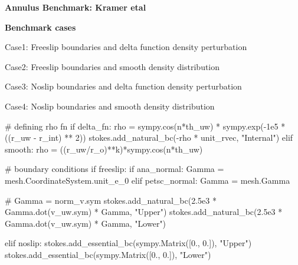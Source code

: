 \documentclass[12pt]{article}
\numberwithin{equation}{subsection}
\begin{document}
 

\cleardoublepage
{}
\recalctypearea
{}

\eject \pdfpagewidth=11.4in \pdfpageheight=10.8in 

\newpage

\vspace{1.5in} 

\textbf{Annulus Benchmark: Kramer etal}

\newpage

\textbf{Benchmark cases}
\vspace{0.2in}

\begin{adjustwidth}{1cm}{4cm}

\hspace{0.19in} Case1: Freeslip boundaries and delta function density perturbation 

Case2: Freeslip boundaries and smooth density distribution

Case3: Noslip boundaries and delta function density perturbation

Case4: Noslip boundaries and smooth density distribution 


\begin{python}
	# defining rho fn
	if delta_fn:
		rho = sympy.cos(n*th_uw) * sympy.exp(-1e5 * ((r_uw - r_int) ** 2))
		stokes.add_natural_bc(-rho * unit_rvec, "Internal")
	elif smooth:
		rho = ((r_uw/r_o)**k)*sympy.cos(n*th_uw)
	
	# boundary conditions
	if freeslip:
		if ana_normal:
			Gamma = mesh.CoordinateSystem.unit_e_0
		elif petsc_normal:
			Gamma = mesh.Gamma
	
		# Gamma = norm_v.sym
		stokes.add_natural_bc(2.5e3 * Gamma.dot(v_uw.sym) *  Gamma, "Upper")
		stokes.add_natural_bc(2.5e3 * Gamma.dot(v_uw.sym) *  Gamma, "Lower")
	
	elif noslip:
		stokes.add_essential_bc(sympy.Matrix([0., 0.]), "Upper")
		stokes.add_essential_bc(sympy.Matrix([0., 0.]), "Lower")
\end{python}
\end{adjustwidth}
\end{document}
